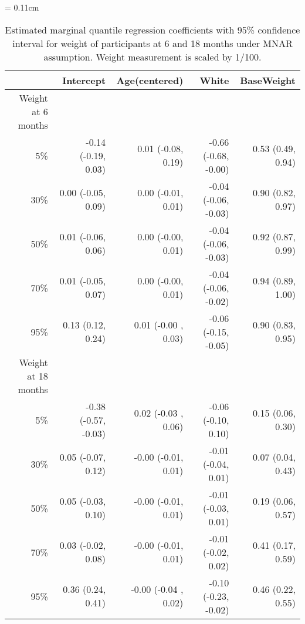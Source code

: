\documentclass[12pt]{article}
\begin{document}
\begin{table}
  \renewcommand{\arraystretch}{1.3}
  \begin{center}
    \caption{Estimated marginal quantile regression coefficients with
      95\% confidence interval for weight of participants at 6 and 18
      months under MNAR assumption. Weight measurement is scaled by
      1/100.}\label{tab:toursmnar}
    \vspace{10pt} \tabcolsep = 0.11cm
    \begin{tabular}{rrrrr}
      \toprule
      & Intercept            & Age(centered)        & White                & BaseWeight        \\
      \hline
      Weight at 6 months                                                                            \\
      5\%  & -0.14 (-0.19, 0.03)  & 0.01 (-0.08, 0.19)   & -0.66 (-0.68, -0.00) & 0.53 (0.49, 0.94) \\
      30\% & 0.00 (-0.05, 0.09)   & 0.00 (-0.01, 0.01)   & -0.04 (-0.06, -0.03) & 0.90 (0.82, 0.97) \\
      50\% & 0.01 (-0.06, 0.06)   & 0.00 (-0.00, 0.01)   & -0.04 (-0.06, -0.03) & 0.92 (0.87, 0.99) \\
      70\% & 0.01 (-0.05, 0.07)   & 0.00 (-0.00, 0.01)   & -0.04 (-0.06, -0.02) & 0.94 (0.89, 1.00) \\
      95\% & 0.13 (0.12, 0.24)    & 0.01 (-0.00 , 0.03)  & -0.06 (-0.15, -0.05) & 0.90 (0.83, 0.95) \\
      Weight at 18 months                                                                           \\
      5\%  & -0.38 (-0.57, -0.03) & 0.02 (-0.03 , 0.06)  & -0.06 (-0.10, 0.10)  & 0.15 (0.06, 0.30) \\
      30\% & 0.05 (-0.07, 0.12)   & -0.00 (-0.01, 0.01)  & -0.01 (-0.04, 0.01)  & 0.07 (0.04, 0.43) \\
      50\% & 0.05 (-0.03, 0.10)   & -0.00 (-0.01, 0.01)  & -0.01 (-0.03, 0.01)  & 0.19 (0.06, 0.57) \\
      70\% & 0.03 (-0.02, 0.08)   & -0.00 (-0.01, 0.01)  & -0.01 (-0.02, 0.02)  & 0.41 (0.17, 0.59) \\
      95\% & 0.36 (0.24, 0.41)    & -0.00 (-0.04 , 0.02) & -0.10 (-0.23, -0.02) & 0.46 (0.22, 0.55) \\
      \bottomrule
    \end{tabular}
  \end{center}
\end{table}
\end{document}
